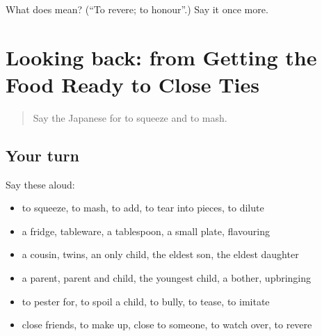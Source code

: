 \begin{tcolorbox}[breakable,colback=teal!4,colframe=teal!35!black,title={Before you move on}]
What does  mean? (\textquotedblleft{}To revere; to honour\textquotedblright{}.) Say it once more.
\end{tcolorbox}
\section[(dialogue)]{Looking back: from Getting the Food Ready to Close Ties}

\label{lesson:JA-R479-review-474-479}



\begin{quote}
Say the Japanese for to squeeze and to mash.
\end{quote}

\subsection*{Your turn}
Say these aloud:

\begin{itemize}
\raggedright
  \item to squeeze, to mash, to add, to tear into pieces, to dilute
  \item a fridge, tableware, a tablespoon, a small plate, flavouring
  \item a cousin, twins, an only child, the eldest son, the eldest daughter
  \item a parent, parent and child, the youngest child, a bother, upbringing
  \item to pester for, to spoil a child, to bully, to tease, to imitate
  \item close friends, to make up, close to someone, to watch over, to revere
\end{itemize}

